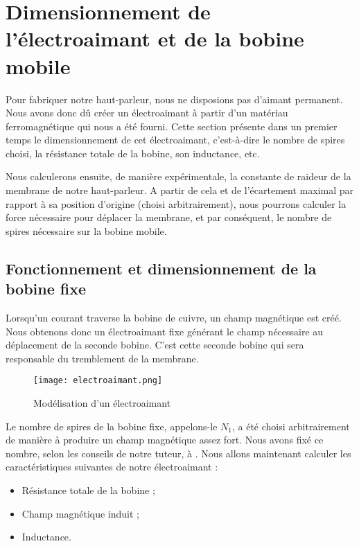 

\section{Dimensionnement de l'électroaimant et de la bobine mobile}
Pour fabriquer notre haut-parleur, nous ne disposions pas d'aimant permanent. Nous avons donc
dû créer un électroaimant à partir d'un matériau ferromagnétique qui nous a été fourni.
Cette section présente dans un premier temps le dimensionnement de cet électroaimant, c'est-à-dire le
nombre de spires choisi, la résistance totale de la bobine, son inductance, etc.

Nous calculerons ensuite, de manière expérimentale, la constante de raideur de la membrane de
notre haut-parleur. A partir de cela et de l'écartement maximal par rapport à sa position d'origine 
(choisi arbitrairement), 
nous pourrons calculer la force nécessaire pour déplacer la membrane, et par conséquent, le nombre
de spires nécessaire sur la bobine mobile.

\subsection{Fonctionnement et dimensionnement de la bobine fixe}
Lorsqu'un courant traverse la bobine de cuivre, un champ magnétique est créé.  Nous obtenons 
donc un électroaimant fixe générant le champ nécessaire au déplacement de la seconde bobine. 
C'est cette seconde bobine qui sera responsable du tremblement de la membrane.

\begin{figure}[ht!]
\centering
\texttt{[image: electroaimant.png]}
\caption{Modélisation d'un électroaimant}
\label{modélisation de l'électroaimant}
\end{figure}

Le nombre de spires de la bobine fixe, appelons-le $N_1$, a été choisi arbitrairement de manière à produire un
champ magnétique assez fort. Nous avons fixé ce nombre, selon les conseils de notre tuteur, à . 
Nous allons maintenant calculer les caractéristiques suivantes de notre électroaimant :

\begin{itemize}
	\item Résistance totale de la bobine ;
	\item Champ magnétique induit ;
	\item Inductance.
\end{itemize}

